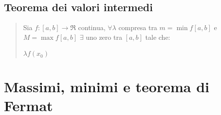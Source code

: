 \documentclass{article}
\begin{document}
\subsection{Teorema dei valori intermedi}

\begin{quote}
    Sia $f: [a, b] \rightarrow \Re$ continua,
    $\forall \lambda$ compresa tra $m = \min f[a, b]$ e $M = \max f[a, b]$
    $\exists$ uno zero tra $[a, b]$ tale che:

    $\lambda f(x_0)$
\end{quote}
    
\section{Massimi, minimi e teorema di Fermat}
\end{document}

